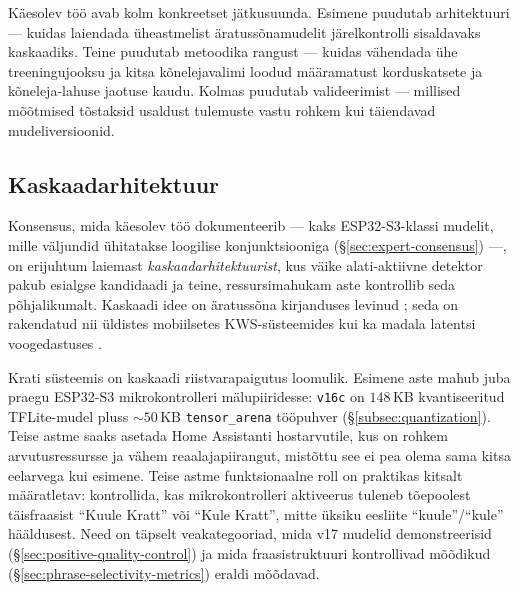 Käesolev töö avab kolm konkreetset jätkusuunda. Esimene puudutab arhitektuuri --- kuidas laiendada üheastmelist äratussõnamudelit järelkontrolli sisaldavaks kaskaadiks. Teine puudutab metoodika rangust --- kuidas vähendada ühe treeningujooksu ja kitsa kõnelejavalimi loodud määramatust korduskatsete ja kõneleja-lahuse jaotuse kaudu. Kolmas puudutab valideerimist --- millised mõõtmised tõstaksid usaldust tulemuste vastu rohkem kui täiendavad mudeliversioonid.

\subsection{Kaskaadarhitektuur}
\label{sec:future-cascade}

Konsensus, mida käesolev töö dokumenteerib --- kaks ESP32-S3-klassi mudelit, mille väljundid ühitatakse loogilise konjunktsiooniga (§\ref{sec:expert-consensus}) ---, on erijuhtum laiemast \emph{kaskaadarhitektuurist}, kus väike alati-aktiivne detektor pakub esialgse kandidaadi ja teine, ressursimahukam aste kontrollib seda põhjalikumalt. Kaskaadi idee on äratussõna kirjanduses levinud \cite{gruenstein2017cascade,apple_voice_trigger_2023}; seda on rakendatud nii üldistes mobiilsetes KWS-süsteemides \cite{michaely2017googlekws,sigtia2020multitask} kui ka madala latentsi voogedastuses \cite{garg2021streaming}.

Krati süsteemis on kaskaadi riistvarapaigutus loomulik. Esimene aste mahub juba praegu ESP32-S3 mikrokontrolleri mälupiiridesse: \texttt{v16c} on $148$\,KB kvantiseeritud TFLite-mudel pluss ${\sim}50$\,KB \texttt{tensor\_arena} tööpuhver (§\ref{subsec:quantization}). Teise astme saaks asetada Home Assistanti hostarvutile, kus on rohkem arvutusressursse ja vähem reaalajapiirangut, mistõttu see ei pea olema sama kitsa eelarvega kui esimene. Teise astme funktsionaalne roll on praktikas kitsalt määratletav: kontrollida, kas mikrokontrolleri aktiveerus tuleneb tõepoolest täisfraasist \enquote{Kuule Kratt} või \enquote{Kule Kratt}, mitte üksiku eesliite \enquote{kuule}/\enquote{kule} hääldusest. Need on täpselt veakategooriad, mida v17 mudelid demonstreerisid (§\ref{sec:positive-quality-control}) ja mida fraasistruktuuri kontrollivad mõõdikud (§\ref{sec:phrase-selectivity-metrics}) eraldi mõõdavad.

